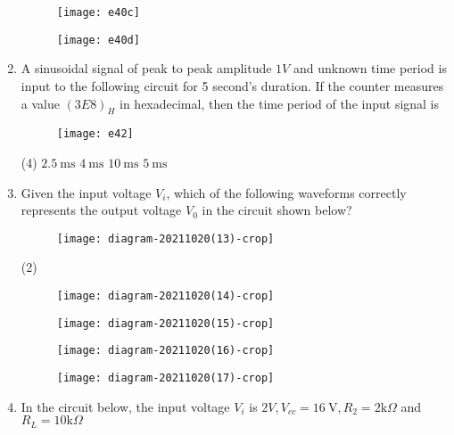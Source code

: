 \begin{enumerate}
\begin{tasks}
\begin{figure}[H]
	\centering
	\texttt{[image: e40c]}
\end{figure}
\task[\textbf{D.}] \begin{figure}[H]
	\centering
	\texttt{[image: e40d]}
\end{figure}
\end{tasks}
	\item A sinusoidal signal of peak to peak amplitude $1 V$ and unknown time period is input to the following circuit for 5 second's duration. If the counter measures a value $(3 E 8)_{H}$ in hexadecimal, then the time period of the input signal is
{	}
\begin{figure}[H]
\centering
\texttt{[image: e42]}
\end{figure}
\begin{tasks}(4)
\task[\textbf{A.}] $2.5 \mathrm{~ms}$
\task[\textbf{B.}] $4 \mathrm{~ms}$
\task[\textbf{C.}]  $10 \mathrm{~ms}$
\task[\textbf{D.}] $5 \mathrm{~ms}$
\end{tasks}
	\item Given the input voltage $V_{i}$, which of the following waveforms correctly represents the output voltage $V_{0}$ in the circuit shown below?
{	}
\begin{figure}[H]
\centering
\texttt{[image: diagram-20211020(13)-crop]}
\end{figure}
\begin{tasks}(2)
\task[\textbf{A.}] \begin{figure}[H]
	\centering
	\texttt{[image: diagram-20211020(14)-crop]}
\end{figure}
\task[\textbf{B.}] \begin{figure}[H]
	\centering
	\texttt{[image: diagram-20211020(15)-crop]}
\end{figure}
\task[\textbf{C.}] \begin{figure}[H]
	\centering
	\texttt{[image: diagram-20211020(16)-crop]}
\end{figure}
\task[\textbf{D.}] \begin{figure}[H]
	\centering
	\texttt{[image: diagram-20211020(17)-crop]}
\end{figure}
\end{tasks}
	\item  In the circuit below, the input voltage $V_{i}$ is $2 V, V_{c c}=16 \mathrm{~V}, R_{2}=2 \mathrm{k} \Omega$ and $R_{L}=10 \mathrm{k} \Omega$\\

\end{enumerate}
